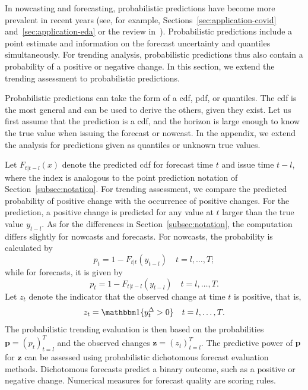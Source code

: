 In nowcasting and forecasting, probabilistic predictions have become more prevalent in recent years (see, for example, Sections~\ref{sec:application-covid} and~\ref{sec:application-eda} or the review in~\cite{Gneiting2014}).
Probabilistic predictions include a point estimate and information on the forecast uncertainty and quantiles simultaneously.
For trending analysis, probabilistic predictions thus also contain a probability of a positive or negative change.
In this section, we extend the trending assessment to probabilistic predictions.

Probabilistic predictions can take the form of a \ac{cdf}, \ac{pdf}, or quantiles.
The \ac{cdf} is the most general and can be used to derive the others, given they exist.
Let us first assume that the prediction is a \ac{cdf}, and the horizon is large enough to know the true value when issuing the forecast or nowcast.
In the appendix, we extend the analysis for predictions given as quantiles or unknown true values.

Let $F_{t | t-l} (x)$ denote the predicted \ac{cdf} for forecast time $t$ and issue time $t - l$, where the index is analogous to the point prediction notation of Section~\ref{subsec:notation}.
For trending assessment, we compare the predicted probability of positive change with the occurrence of positive changes. 
For the prediction, a positive change is predicted for any value at $t$ larger than the true value $y_{t-l}$. 
As for the differences in Section~\ref{subsec:notation}, the computation differs slightly for nowcasts and forecasts.
For nowcasts, the probability is calculated by
\begin{equation*}
    p_t = 1 - F_{t | t} (y_{t-l})\quad t = l, \dots, T;
\end{equation*}
while for forecasts, it is given by
\begin{equation*}
    p_t = 1 - F_{t | t-l} (y_{t-l})\quad t = l, \dots, T.
\end{equation*}
Let $z_t$ denote the indicator that the observed change at time $t$ is positive, that is,
\begin{equation*}
    z_t = \ind{\diffyt > 0} \quad t = l, \dots, T.
\end{equation*}
The probabilistic trending evaluation is then based on the probabilities $\mathbf{p} = (p_t)_{t=l}^{T}$ and the observed changes $\mathbf{z} = (z_t)_{t=l}^{T}$.
The predictive power of $\mathbf{p}$ for $\mathbf{z}$ can be assessed using probabilistic dichotomous forecast evaluation methods.
Dichotomous forecasts predict a binary outcome, such as a positive or negative change.
Numerical measures for forecast quality are scoring rules.

